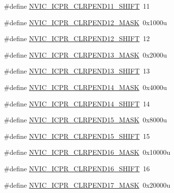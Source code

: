 \begin{DoxyCompactItemize}
\item 
\#define \hyperlink{group___n_v_i_c___register___masks_gafc17410ea00dcbc753eb4f900edce1e1}{N\+V\+I\+C\+\_\+\+I\+C\+P\+R\+\_\+\+C\+L\+R\+P\+E\+N\+D11\+\_\+\+S\+H\+I\+FT}~11
\item 
\#define \hyperlink{group___n_v_i_c___register___masks_ga9d5252287a925cac9af288dd64777004}{N\+V\+I\+C\+\_\+\+I\+C\+P\+R\+\_\+\+C\+L\+R\+P\+E\+N\+D12\+\_\+\+M\+A\+SK}~0x1000u
\item 
\#define \hyperlink{group___n_v_i_c___register___masks_ga1c53ed4d054368298f6679a0428c9d75}{N\+V\+I\+C\+\_\+\+I\+C\+P\+R\+\_\+\+C\+L\+R\+P\+E\+N\+D12\+\_\+\+S\+H\+I\+FT}~12
\item 
\#define \hyperlink{group___n_v_i_c___register___masks_ga7020b8593e10611a356e186f27203236}{N\+V\+I\+C\+\_\+\+I\+C\+P\+R\+\_\+\+C\+L\+R\+P\+E\+N\+D13\+\_\+\+M\+A\+SK}~0x2000u
\item 
\#define \hyperlink{group___n_v_i_c___register___masks_ga7b96188c0b41174685c050b4c6c65e23}{N\+V\+I\+C\+\_\+\+I\+C\+P\+R\+\_\+\+C\+L\+R\+P\+E\+N\+D13\+\_\+\+S\+H\+I\+FT}~13
\item 
\#define \hyperlink{group___n_v_i_c___register___masks_gafee2bcb6dd7c7df0cfda563fec4ac23f}{N\+V\+I\+C\+\_\+\+I\+C\+P\+R\+\_\+\+C\+L\+R\+P\+E\+N\+D14\+\_\+\+M\+A\+SK}~0x4000u
\item 
\#define \hyperlink{group___n_v_i_c___register___masks_ga9cda793e37ef0a15b38d483ee99ac550}{N\+V\+I\+C\+\_\+\+I\+C\+P\+R\+\_\+\+C\+L\+R\+P\+E\+N\+D14\+\_\+\+S\+H\+I\+FT}~14
\item 
\#define \hyperlink{group___n_v_i_c___register___masks_ga9058b74adb69075ad3fff1760c32339f}{N\+V\+I\+C\+\_\+\+I\+C\+P\+R\+\_\+\+C\+L\+R\+P\+E\+N\+D15\+\_\+\+M\+A\+SK}~0x8000u
\item 
\#define \hyperlink{group___n_v_i_c___register___masks_gae890e6dcf8ab6b3e54b397bcdb02a687}{N\+V\+I\+C\+\_\+\+I\+C\+P\+R\+\_\+\+C\+L\+R\+P\+E\+N\+D15\+\_\+\+S\+H\+I\+FT}~15
\item 
\#define \hyperlink{group___n_v_i_c___register___masks_ga684cd3d2aacdc8e0190e94e3171d11e5}{N\+V\+I\+C\+\_\+\+I\+C\+P\+R\+\_\+\+C\+L\+R\+P\+E\+N\+D16\+\_\+\+M\+A\+SK}~0x10000u
\item 
\#define \hyperlink{group___n_v_i_c___register___masks_ga9749478423849ad51523ac1620bb3613}{N\+V\+I\+C\+\_\+\+I\+C\+P\+R\+\_\+\+C\+L\+R\+P\+E\+N\+D16\+\_\+\+S\+H\+I\+FT}~16
\item 
\#define \hyperlink{group___n_v_i_c___register___masks_gaf2659b46d5d9c3fd79ca8f2459f85e5e}{N\+V\+I\+C\+\_\+\+I\+C\+P\+R\+\_\+\+C\+L\+R\+P\+E\+N\+D17\+\_\+\+M\+A\+SK}~0x20000u

\end{DoxyCompactItemize}
